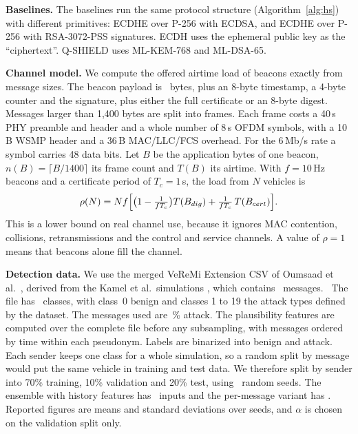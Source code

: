 \documentclass[journal,twoside]{IEEEtran}
\begin{document}
\textbf{Baselines.} The baselines run the same protocol structure (Algorithm~\ref{alg:hs}) with different primitives: ECDHE over P-256 with ECDSA, and ECDHE over P-256 with RSA-3072-PSS signatures. ECDH uses the ephemeral public key as the ``ciphertext''. Q-SHIELD uses ML-KEM-768 and ML-DSA-65.

\textbf{Channel model.} We compute the offered airtime load of beacons exactly from message sizes. The beacon payload is \bsmPayload\ bytes, plus an 8-byte timestamp, a 4-byte counter and the signature, plus either the full certificate or an 8-byte digest. Messages larger than 1{,}400 bytes are split into frames. Each frame costs a 40\,\textmu s PHY preamble and header and a whole number of 8\,\textmu s OFDM symbols, with a 10\,B WSMP header and a 36\,B MAC/LLC/FCS overhead. For the 6\,Mb/s rate a symbol carries 48 data bits. Let $B$ be the application bytes of one beacon, $n(B)=\lceil B/1400\rceil$ its frame count and $T(B)$ its airtime. With $f=10$\,Hz beacons and a certificate period of $T_c=1$\,s, the load from $N$ vehicles is
\begin{equation}
\rho(N)=N f\Bigl[\bigl(1-\tfrac{1}{fT_c}\bigr)T(B_{dig})+\tfrac{1}{fT_c}\,T(B_{cert})\Bigr].
\label{eq:load}
\end{equation}
This is a lower bound on real channel use, because it ignores MAC contention, collisions, retransmissions and the control and service channels. A value of $\rho=1$ means that beacons alone fill the channel.

\textbf{Detection data.} We use the merged VeReMi Extension CSV of Oumsaad et al.\ \cite{oumsaad2023}, derived from the Kamel et al.\ simulations \cite{kamel2020}, which contains \idsRowsTotal\ messages. \idsSubsample\ The file has \idsClasses\ classes, with class~0 benign and classes 1 to 19 the attack types defined by the dataset. The messages used are \idsAttackPct\,\% attack. The plausibility features are computed over the complete file before any subsampling, with messages ordered by time within each pseudonym. Labels are binarized into benign and attack. Each sender keeps one class for a whole simulation, so a random split by message would put the same vehicle in training and test data. We therefore split by sender into 70\% training, 10\% validation and 20\% test, using \idsSeeds\ random seeds. The ensemble with history features has \idsFeatures\ inputs and the per-message variant has \idsSingleFeatures. Reported figures are means and standard deviations over seeds, and $\alpha$ is chosen on the validation split only.
\end{document}
